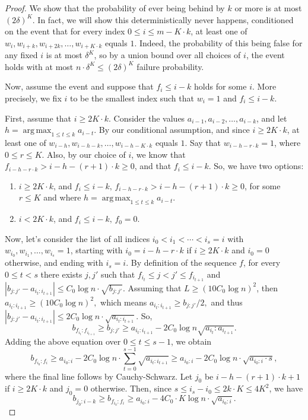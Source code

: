 \documentclass[12pt]{article}
\theoremstyle{definition}
\theoremstyle{remark}
\DeclareMathOperator*{\argmax}{arg\,max}
\begin{document}
\begin{proof}
    We show that the probability of ever being behind by $k$ or more is at most $(2\delta)^{K}$. In fact, we will show this deterministically never happens, conditioned on the event that for every index $0 \le i \le m- K \cdot k$, at least one of $w_i, w_{i+k}, w_{i+2k}, \dots, w_{i+ K \cdot k}$ equals $1$. Indeed, the probability of this being false for any fixed $i$ is at most $\delta^{K}$, so by a union bound over all choices of $i$, the event holds with at most $n \cdot \delta^K \le (2\delta)^{K}$ failure probability.

    Now, assume the event and suppose that $f_i \le i-k$ holds for some $i$. More precisely, we fix $i$ to be the smallest index such that $w_i = 1$ and $f_i \le i-k$.


    First, assume that $i \ge 2K \cdot k$. Consider the values $a_{i-1}, a_{i-2}, \dots, a_{i-k}$, and let $h = \argmax_{1 \le t \le k} a_{i-t}.$ By our conditional assumption, and since $i \ge 2K \cdot k$, at least one of $w_{i-h}, w_{i-h-k}, \dots, w_{i-h-K \cdot k}$ equals $1$. Say that $w_{i-h-r \cdot k} = 1$, where $0 \le r \le K$. Also, by our choice of $i$, we know that $f_{i-h-r \cdot k} > i-h-(r+1) \cdot k \ge 0$, and that $f_i \le i-k$. So, we have two options:
\begin{enumerate}
    \item $i \ge 2K \cdot k$, and $f_i \le i-k ,\, f_{i-h-r \cdot k} > i-h-(r+1) \cdot k \ge 0$, for some $r \le K$ and where $h = \argmax_{1 \le t \le k} a_{i-t}$.
    \item $i < 2K \cdot k$, and $f_i \le i-k,\, f_0 = 0$.
\end{enumerate}

    Now, let's consider the list of all indices $i_0 < i_1 < \cdots < i_s = i$ with $w_{i_0}, w_{i_1}, \dots, w_{i_s} = 1$, starting with $i_0 = i-h-r \cdot k$ if $i \ge 2 K \cdot k$ and $i_0 = 0$ otherwise, and ending with $i_s = i$. By definition of the sequence $f$, for every $0 \le t < s$ there exists $j, j'$ such that $f_{i_t} \le j < j' \le f_{i_{t+1}}$ and $|b_{j:j'} - a_{i_t:i_{t+1}}| \le C_0 \log n \cdot \sqrt{b_{j:j'}}$. Assuming that $L \ge (10 C_0 \log n)^2$, then $a_{i_t:i_{t+1}} \ge (10 C_0 \log n)^2,$ which means $a_{i_t:i_{t+1}} \ge b_{j:j'}/2,$ and thus $|b_{j:j'} - a_{i_t:i_{t+1}}| \le 2 C_0 \log n \cdot \sqrt{a_{i_t:i_{t+1}}}.$ So, 
\[b_{f_{i_t}:f_{i_{t+1}}} \ge b_{j:j'} \ge a_{i_t:i_{t+1}} - 2C_0 \log n \sqrt{a_{i_t}:a_{i_{t+1}}}.\]
    Adding the above equation over $0 \le t \le s-1$, we obtain 
\[b_{f_{i_0}:f_i} \ge a_{i_0:i} - 2 C_0 \log n \cdot \sum_{t=0}^{s-1} \sqrt{a_{i_t:i_{t+1}}} \ge a_{i_0:i} - 2 C_0 \log n \cdot \sqrt{a_{i_0:i} \cdot s},\]
    where the final line follows by Cauchy-Schwarz. Let $j_0$ be $i-h-(r+1) \cdot k+1$ if $i \ge 2K \cdot k$ and $j_0 = 0$ otherwise. Then, since $s \le i_s-i_0 \le 2 k \cdot K \le 4K^2$, we have
\begin{equation} \label{eq:b-bigger-than-a}
    b_{j_0:i-k} \ge b_{f_{i_0}:f_i} \ge a_{i_0:i} - 4 C_0 \cdot K \log n \cdot \sqrt{a_{i_0:i}}.
\end{equation}


\end{proof}
\end{document}
